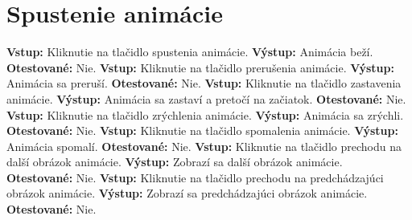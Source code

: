 \documentclass[12pt,a4paper]{report}
\begin{document}
\section[Spustenie animácie]{\rmfamily\bfseries
	Spustenie animácie}
\begin{flushleft}
	\textbf{Vstup:} Kliknutie na tlačidlo spustenia animácie.\linebreak
	\textbf{Výstup:} Animácia beží.\linebreak
	\textbf{Otestované:} Nie.\linebreak
	\linebreak
	\textbf{Vstup:} Kliknutie na tlačidlo prerušenia animácie.\linebreak
	\textbf{Výstup:} Animácia sa preruší.\linebreak
	\textbf{Otestované:} Nie.\linebreak
	\linebreak
	\textbf{Vstup:} Kliknutie na tlačidlo zastavenia animácie.\linebreak
	\textbf{Výstup:} Animácia sa zastaví a pretočí na začiatok.\linebreak
	\textbf{Otestované:} Nie.\linebreak
	\linebreak
	\textbf{Vstup:} Kliknutie na tlačidlo zrýchlenia animácie.\linebreak
	\textbf{Výstup:} Animácia sa zrýchli.\linebreak
	\textbf{Otestované:} Nie.\linebreak
	\linebreak
	\textbf{Vstup:} Kliknutie na tlačidlo spomalenia animácie.\linebreak
	\textbf{Výstup:} Animácia spomalí.\linebreak
	\textbf{Otestované:} Nie.\linebreak
	\linebreak
	\textbf{Vstup:} Kliknutie na tlačidlo prechodu na další obrázok animácie.\linebreak
	\textbf{Výstup:} Zobrazí sa další obrázok animácie.\linebreak
	\textbf{Otestované:} Nie.\linebreak
	\linebreak
	\textbf{Vstup:} Kliknutie na tlačidlo prechodu na predchádzajúci obrázok animácie.\linebreak
	\textbf{Výstup:} Zobrazí sa predchádzajúci obrázok animácie.\linebreak
	\textbf{Otestované:} Nie.\linebreak

\end{flushleft}
\end{document}
